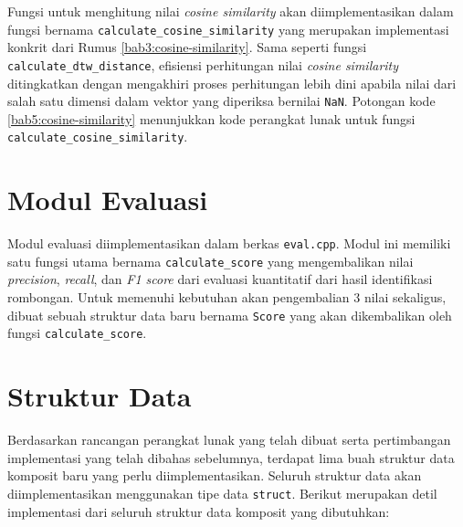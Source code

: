 Fungsi untuk menghitung nilai \textit{cosine similarity} akan diimplementasikan dalam fungsi bernama \texttt{calculate\_cosine\_similarity} yang merupakan implementasi konkrit dari Rumus \ref{bab3:cosine-similarity}. Sama seperti fungsi \texttt{calculate\_dtw\_distance}, efisiensi perhitungan nilai \textit{cosine similarity} ditingkatkan dengan mengakhiri proses perhitungan lebih dini apabila nilai dari salah satu dimensi dalam vektor yang diperiksa bernilai \texttt{NaN}. Potongan kode \ref{bab5:cosine-similarity} menunjukkan kode perangkat lunak untuk fungsi \texttt{calculate\_cosine\_similarity}.

\section{Modul Evaluasi}
\label{sec:impl-eval}

Modul evaluasi diimplementasikan dalam berkas \texttt{eval.cpp}. Modul ini memiliki satu fungsi utama bernama \texttt{calculate\_score} yang mengembalikan nilai \textit{precision}, \textit{recall}, dan \textit{F1 score} dari evaluasi kuantitatif dari hasil identifikasi rombongan. Untuk memenuhi kebutuhan akan pengembalian 3 nilai sekaligus, dibuat sebuah struktur data baru bernama \texttt{Score} yang akan dikembalikan oleh fungsi \texttt{calculate\_score}. 

\section{Struktur Data}
\label{sec:impl-struct}

Berdasarkan rancangan perangkat lunak yang telah dibuat serta pertimbangan implementasi yang telah dibahas sebelumnya, terdapat lima buah struktur data komposit baru yang perlu diimplementasikan. Seluruh struktur data akan diimplementasikan menggunakan tipe data \texttt{struct}. Berikut merupakan detil implementasi dari seluruh struktur data komposit yang dibutuhkan:

